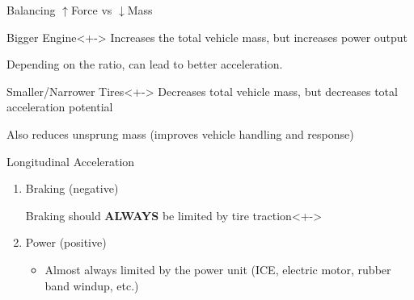 \documentclass[aspectratio=169]{beamer}
\begin{document}
\begin{frame}{Balancing \(\uparrow\)Force vs \(\downarrow\)Mass}
    \begin{exampleblock}{Bigger Engine}<+->
        Increases the total vehicle mass, but increases power output

        Depending on the ratio, can lead to better acceleration.
    \end{exampleblock}

    \vspace{10pt}
    \begin{exampleblock}{Smaller/Narrower Tires}<+->
        Decreases total vehicle mass, but decreases total acceleration potential

        Also reduces unsprung mass (improves vehicle handling and response)
    \end{exampleblock}
\end{frame}

\begin{frame}{Longitudinal Acceleration}

    \begin{enumerate}
        \item<+-> Braking (negative)
            \begin{alertblock}{Braking should \textbf{ALWAYS} be limited by tire traction}<+->
                \begin{itemize}
                \end{itemize}
            \end{alertblock}
        \item<+-> Power (positive)
        \begin{itemize}
            \item<+-> Almost always limited by the power unit (ICE, electric motor, rubber band windup, etc.)
        \end{itemize}
    \end{enumerate}
\end{frame}
\end{document}
